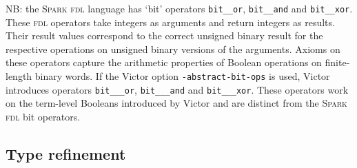 \documentclass[12pt,fleqn]{article}
\newcommand{\spark}{\textsc{Spark}}
\newcommand{\fdl}{\textsc{fdl}}
\begin{document}
NB: the \spark{} \fdl{} language has `bit' operators 
\texttt{bit\_\_or},
\texttt{bit\_\_and} and 
\texttt{bit\_\_xor}.
%
These \fdl{} operators take integers as arguments and return integers
as results.  Their result values correspond to the correct unsigned
binary result for the respective operations on unsigned binary
versions of the arguments.  Axioms on these operators capture the
arithmetic properties of Boolean operations on finite-length binary
words.
%
If the Victor option \texttt{-abstract-bit-ops} is used, Victor introduces 
operators
\texttt{bit\_\_\_or},
\texttt{bit\_\_\_and} and 
\texttt{bit\_\_\_xor}.
%
These operators work on the term-level Booleans introduced by Victor and
are distinct from the \spark{} \fdl{} bit operators.

\subsection{Type refinement}
\end{document}

